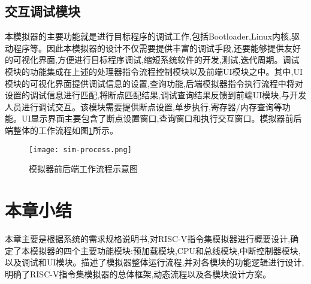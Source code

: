 \subsection{交互调试模块}
本模拟器的主要功能就是进行目标程序的调试工作,包括Bootloader,Linux内核,驱动程序等。因此本模拟器的设计不仅需要提供丰富的调试手段,还要能够提供友好的可视化界面,方便进行目标程序调试,缩短系统软件的开发,测试,迭代周期。调试模块的功能集成在上述的处理器指令流程控制模块以及前端UI模块之中。其中,UI模块的可视化界面提供调试信息的设置,查询功能,后端模拟器指令执行流程中将对设置的调试信息进行匹配,将断点匹配结果,调试查询结果反馈到前端UI模块,与开发人员进行调试交互。该模块需要提供断点设置,单步执行,寄存器/内存查询等功能。UI显示界面主要包含了断点设置窗口,查询窗口和执行交互窗口。模拟器前后端整体的工作流程如图\ref{fig:work-frame}所示。
\begin{figure}[H]
  \centering
  \texttt{[image: sim-process.png]}
  \caption{模拟器前后端工作流程示意图}
  \label{fig:work-frame}
\end{figure}

\section{本章小结}
本章主要是根据系统的需求规格说明书,对RISC-V指令集模拟器进行概要设计,确定了本模拟器的四个主要功能模块:预加载模块,CPU和总线模块,中断控制器模块,以及调试和UI模块。描述了模拟器整体运行流程,并对各模块的功能逻辑进行设计,明确了RISC-V指令集模拟器的总体框架,动态流程以及各模块设计方案。